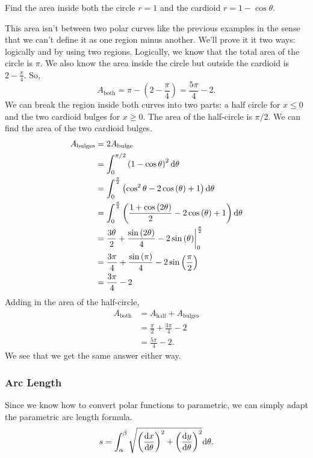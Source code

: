 \begin{example}
	Find the area inside both the circle $r=1$ and the cardioid $r=1-\cos{\theta}$.
\end{example}
This area isn't between two polar curves like the previous examples in the sense that we can't define it as one region minus another.
We'll prove it it two ways: logically and by using two regions.
Logically, we know that the total area of the circle is $\pi$.
We also know the area inside the circle but outside the cardioid is $2-\frac{\pi}{4}$.
So,
\begin{equation*}
	A_{\text{both}} = \pi - \left(2-\frac{\pi}{4}\right) = \frac{5\pi}{4} - 2.
\end{equation*}
\indent
We can break the region inside both curves into two parts: a half circle for $x\leq 0$ and the two cardioid bulges for $x\geq 0$.
The area of the half-circle is $\pi/2$.
We can find the area of the two cardioid bulges.
\begin{align*}
	A_{\text{bulges}} &= 2A_{\text{bulge}} \\
	&= \int_{0}^{\pi/2}{\left(1-\cos{\theta}\right)^2\mathrm{d} \theta} \\
	&= \int_{0}^{\frac{\pi}{2}}\left(\cos^{2}\theta-2\cos\left(\theta\right)+1\right)\mathrm{d} \theta \\
	&= \int_{0}^{\frac{\pi}{2}}\left(\frac{1+\cos\left(2\theta\right)}{2}-2\cos\left(\theta\right)+1\right)\mathrm{d} \theta \\
	&= \frac{3\theta}{2}+\frac{\sin\left(2\theta\right)}{4}-2\sin\left(\theta\right)\biggr\rvert_{0}^{\frac{\pi}{2}} \\
	&= \frac{3\pi}{4}+\frac{\sin\left(\pi\right)}{4}-2\sin\left(\frac{\pi}{2}\right) \\
	&= \frac{3\pi}{4}-2 \\
\end{align*}
\indent
Adding in the area of the half-circle,
\begin{align*}
	A_{\text{both}} &= A_{\text{half}} + A_{\text{bulges}} \\
	&= \frac{\pi}{2} + \frac{3\pi}{4} - 2 \\
	&= \frac{5\pi}{4} - 2.
\end{align*}
\indent
We see that we get the same answer either way.

\subsubsection{Arc Length}
Since we know how to convert polar functions to parametric, we can simply adapt the parametric arc length formula.
\begin{equation*}
	s = \int_{\alpha}^{\beta}{\sqrt{\left(\frac{\mathrm{d} x}{\mathrm{d} \theta}\right)^2 + \left(\frac{\mathrm{d} y}{\mathrm{d} \theta}\right)^2}\mathrm{d} \theta}.
\end{equation*}

